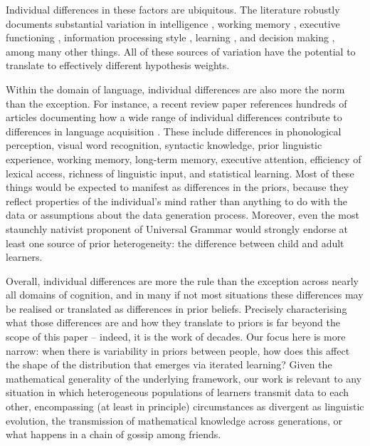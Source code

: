 \documentclass[doc]{apa6}
\begin{document}
Individual differences in these factors are ubiquitous. The literature robustly documents substantial variation in intelligence \parencite{dearyetal00}, working memory \parencite{barrettetal04,unsworthengle07}, executive functioning \parencite{miyakefriedman12}, information processing style \parencite{humphreysrevelle84,epsteinetal96}, learning \parencite{ackerman87, greenwaldetal98}, and decision making \parencite{stanovichwest98,debruinetal07}, among many other things. All of these sources of variation have the potential to translate to effectively different hypothesis weights.

Within the domain of language, individual differences are also more the norm than the exception. For instance, a recent review paper references hundreds of articles documenting how a wide range of individual differences contribute to differences in language acquisition \parencite{kiddetal17}. These include differences in phonological perception, visual word recognition, syntactic knowledge, prior linguistic experience, working memory, long-term memory, executive attention, efficiency of lexical access, richness of linguistic input, and statistical learning. Most of these things would be expected to manifest as differences in the priors, because they reflect properties of the individual's mind rather than anything to do with the data or assumptions about the data generation process. Moreover, even the most staunchly nativist proponent of Universal Grammar would strongly endorse at least one source of prior heterogeneity: the difference between child and adult learners.

Overall, individual differences are more the rule than the exception across nearly all domains of cognition, and in many if not most situations these differences may be realised or translated as differences in prior beliefs. Precisely characterising what those differences are and how they translate to priors is far beyond the scope of this paper -- indeed, it is the work of decades. Our focus here is more narrow: when there is variability in priors between people, how does this affect the shape of the distribution that emerges via iterated learning? Given the mathematical generality of the underlying framework, our work is relevant to any situation in which heterogeneous populations of learners transmit data to each other, encompassing (at least in principle) circumstances as divergent as linguistic evolution, the transmission of mathematical knowledge across generations, or what happens in a chain of gossip among friends.
\end{document}
